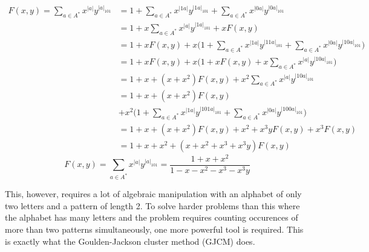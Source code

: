 \documentclass[12pt]{report}
\begin{document}
{{\begin{align*}
F(x,y)=\sum\limits_{a \in A^*} x^{|a|} y^{{|a|}_{101}} &= 1 + \sum\limits_{a \in A^*} x^{|1a|} y^{{|1a|}_{101}} + \sum\limits_{a \in A^*} x^{|0a|} y^{{|0a|}_{101}} \\
&= 1 + x \sum\limits_{a \in A^*} x^{|a|} y^{{|1a|}_{101}} + xF(x,y) \\
&= 1 + xF(x,y) + x \big( 1 + \sum\limits_{a \in A^*} x^{|1a|} y^{{|11a|}_{101}} + \sum\limits_{a \in A^*} x^{|0a|} y^{{|10a|}_{101}} \big) \\
&= 1 + xF(x,y) + x \big( 1 + xF(x,y) + x\sum\limits_{a \in A^*} x^{|a|} y^{{|10a|}_{101}} \big) \\
&= 1 + x + ( x + x^2 )F(x,y) + x^2 \sum\limits_{a \in A^*} x^{|a|} y^{{|10a|}_{101}} \\
&= 1 + x + ( x + x^2 )F(x,y) \\
&+ x^2 \big( 1 + \sum\limits_{a \in A^*} x^{|1a|} y^{{|101a|}_{101}}  + \sum\limits_{a \in A^*} x^{|0a|} y^{{|100a|}_{101}}   \big) \\
&= 1 + x + ( x + x^2)F(x,y) + x^2 + x^3 y F(x,y) + x^3 F(x,y) \\
&= 1 + x + x^2 + ( x + x^2 + x^3 + x^3 y )F(x,y) 
\end{align*}
\[
F(x,y)= \sum\limits_{a \in A^*} x^{|a|} y^{{|a|}_{101}} =\frac{ 1 + x + x^2 }{ 1 - x -x^2 -x^3 -x^3 y}
\]

This, however, requires a lot of algebraic manipulation with an alphabet of only two letters and a pattern of length 2. To solve harder problems than this where the alphabet has many letters and the problem requires counting occurences of more than two patterns simultaneously, one more powerful tool is required. This is exactly what the Goulden-Jackson cluster method (GJCM) does.

}}
\end{document}
